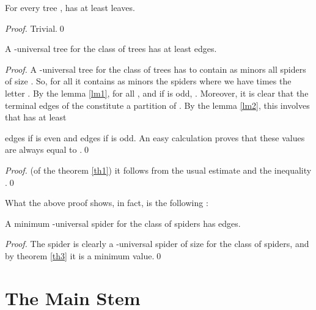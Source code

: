 \documentclass{llncs}
\begin{document}
\begin{lemma}\label{lm2} For every tree ,  has at least  leaves.
\end{lemma}

\begin{proof} Trivial.\qed
\end{proof}



\begin{theorem}\label{th3} A -universal tree  for the class of trees
has at least  edges.
\end{theorem}




\begin{proof}A -universal tree  for the class of trees has to contain as
minors all spiders of size . So, for all  it contains as
minors the spiders  where we have  times the letter . By the lemma
\ref{lm1}, for all ,  and if  is odd, .
Moreover, it is clear that the terminal edges of the  constitute a partition of . By the lemma
\ref{lm2}, this involves that  has at least

 edges if  is even and  edges if  is odd. An easy
 calculation proves that these values are always equal to .\qed
\end{proof}




\begin{proof} (of the theorem \ref{th1}) it follows from the usual estimate
 and the inequality
.\qed
\end{proof}

What the above proof shows, in fact, is the following :





\begin{corollary}A minimum -universal spider for the class of
spiders has  edges.
\end{corollary}




\begin{proof}The spider  is clearly a -universal spider of size
 for the class of
spiders, and by theorem \ref{th3} it is a minimum value.\qed
\end{proof}




\section{The Main Stem}
\end{document}

